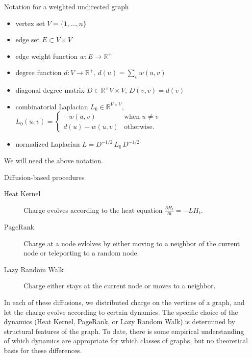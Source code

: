 \documentclass[xcolor=dvipsnames]{beamer}
\begin{document}
\begin{frame}
  \begin{block}{Notation for a weighted undirected graph}
  \begin{itemize}
    \item vertex set $V = \{ 1, \dotsc, n \}$ 
    \item edge set $E \subset V \times V$
    \item edge weight function $w : E \to \mathbb{R}^+$
    \item degree function $d : V \to \mathbb{R}^+$, $d(u) = \sum_v w(u,v)$
    \item diagonal degree matrix $D \in \mathbb{R}^\times{V \times V}$, $D(v,v) = d(v)$
    \item combinatorial Laplacian $L_0 \in \mathbb{R}^{V \times V}$,
    	$L_0(u,v) = \begin{cases}
		-w(u,v) &\text{when $u \neq v$} \\
		d(u) - w(u,v) &\text{otherwise.}
	\end{cases}$
    \item normalized Laplacian $L = D^{-1/2} \, L_0 \, D^{-1/2}$
  \end{itemize}
  \end{block}
  We will need the above notation.
\end{frame}

\begin{frame}
  \begin{block}{Diffusion-based procedures}
  \begin{description}
    \item[Heat Kernel] Charge evolves according to the heat equation
    	$\frac{\partial H_t}{\partial t} = - L H_t$.
    \item[PageRank] Charge at a node evlolves by either moving to a neighbor
    	of the current node or teleporting to a random node.
    \item[Lazy Random Walk] Charge either stays at the current node or moves
        to a neighbor.
  \end{description}
  \end{block}
  In each of these diffusions, we distributed charge on the vertices of a
  graph, and let the charge evolve according to certain dynamics.  The
  specific choice of the dynamics (Heat Kernel, PageRank, or Lazy Random Walk)
  is determined by structural features of the graph.  To date, there is some
  empirical understanding of which dynamics are appropriate for which classes
  of graphs, but no theoretical basis for these differences.
\end{frame}
\end{document}
